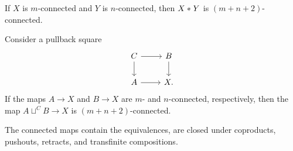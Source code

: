 \begin{thm}
If $X$ is $m$-connected and $Y$ is $n$-connected, then ${X}\ast_{}{Y}$ is $(m+n+2)$-connected. 
\end{thm}

\begin{thm}
Consider a pullback square
\begin{equation*}
\begin{tikzcd}
C \arrow[r] \arrow[d] & B \arrow[d] \\
A \arrow[r] & X.
\end{tikzcd}
\end{equation*}
If the maps $A\to X$ and $B\to X$ are $m$- and $n$-connected, respectively, then the map $A\sqcup^C B\to X$ is $(m+n+2)$-connected.
\end{thm}

\begin{thm}
  The connected maps contain the equivalences, are closed under coproducts, pushouts, retracts, and transfinite compositions.
\end{thm}


